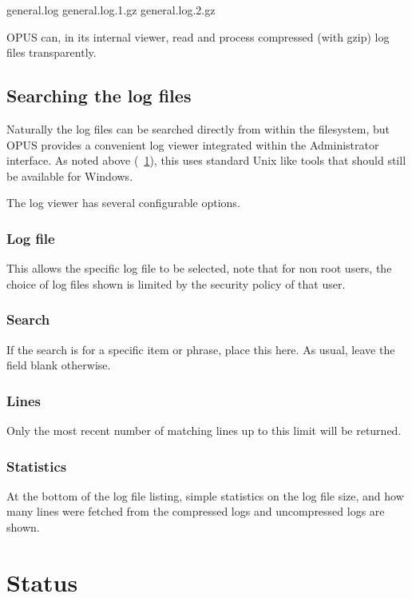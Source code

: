 \documentclass[12 pt]{book}
\begin{document}
general.log
general.log.1.gz
general.log.2.gz

OPUS can, in its internal viewer, read and process compressed (with gzip) log files transparently.


\subsection{Searching the log files}

Naturally the log files can be searched directly from within the filesystem, but OPUS provides a
convenient log viewer integrated within the Administrator interface. As noted above (~\ref{}), this uses standard
Unix like tools that should still be available for Windows.

The log viewer has several configurable options.

\subsubsection{Log file}

This allows the specific log file to be selected, note that for non root users, the choice of log files
shown is limited by the security policy of that user.

\subsubsection{Search}

If the search is for a specific item or phrase, place this here. As usual, leave the field blank otherwise.

\subsubsection{Lines}

Only the most recent number of matching lines up to this limit will be returned.

\subsubsection{Statistics}

At the bottom of the log file listing, simple statistics on the log file size, and how many lines were fetched from the compressed logs and uncompressed logs are shown.

\section{Status}
\end{document}
